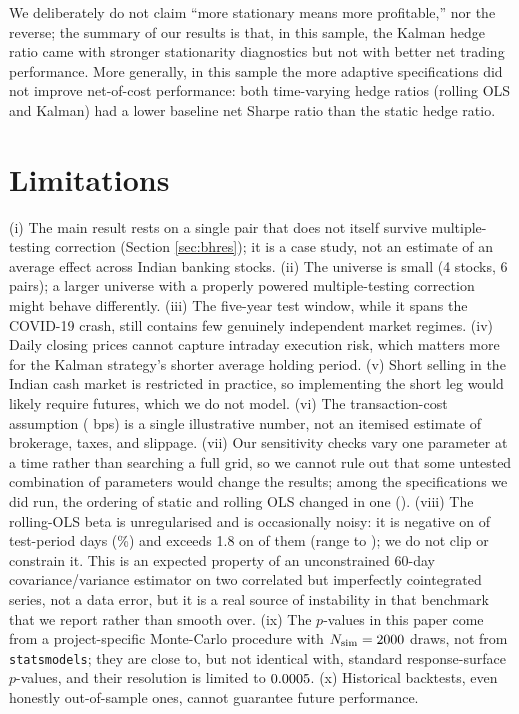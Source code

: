 \documentclass[11pt,a4paper]{article}
\begin{document}
We deliberately do not claim ``more stationary means more profitable,'' nor the reverse; the summary of our results is that, in this sample, the Kalman hedge ratio came with stronger stationarity diagnostics but not with better net trading performance. More generally, in this sample the more adaptive specifications did not improve net-of-cost performance: both time-varying hedge ratios (rolling OLS and Kalman) had a lower baseline net Sharpe ratio than the static hedge ratio.

\section{Limitations}\label{sec:lim}

(i) The main result rests on a single pair that does not itself survive multiple-testing correction (Section \ref{sec:bhres}); it is a case study, not an estimate of an average effect across Indian banking stocks. (ii) The universe is small (4 stocks, 6 pairs); a larger universe with a properly powered multiple-testing correction might behave differently. (iii) The five-year test window, while it spans the COVID-19 crash, still contains few genuinely independent market regimes. (iv) Daily closing prices cannot capture intraday execution risk, which matters more for the Kalman strategy's shorter average holding period. (v) Short selling in the Indian cash market is restricted in practice, so implementing the short leg would likely require futures, which we do not model. (vi) The transaction-cost assumption (\CostBps{} bps) is a single illustrative number, not an itemised estimate of brokerage, taxes, and slippage. (vii) Our sensitivity checks vary one parameter at a time rather than searching a full grid, so we cannot rule out that some untested combination of parameters would change the results; among the \SensNSpecs{} specifications we did run, the ordering of static and rolling OLS changed in one (\SensRollingGtStaticWhere{}). (viii) The rolling-OLS beta is unregularised and is occasionally noisy: it is negative on \RollBetaNeg{} of \RollBetaNTest{} test-period days (\RollBetaNegPct{}\%) and exceeds 1.8 on \RollBetaAbsGtTwo{} of them (range \RollBetaMin{} to \RollBetaMax{}); we do not clip or constrain it. This is an expected property of an unconstrained 60-day covariance/variance estimator on two correlated but imperfectly cointegrated series, not a data error, but it is a real source of instability in that benchmark that we report rather than smooth over. (ix) The $p$-values in this paper come from a project-specific Monte-Carlo procedure with $N_{\text{sim}}=2000{}$ draws, not from \texttt{statsmodels}; they are close to, but not identical with, standard response-surface $p$-values, and their resolution is limited to $0.0005{}$. (x) Historical backtests, even honestly out-of-sample ones, cannot guarantee future performance.
\end{document}
